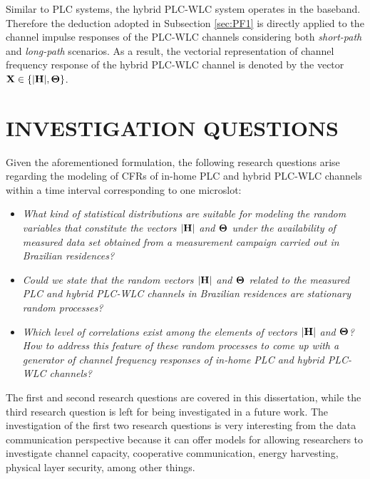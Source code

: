 Similar to \ac{PLC} systems, the hybrid \ac{PLC}-\ac{WLC} system operates in the baseband. Therefore the deduction adopted in Subsection \ref{sec:PF1} is directly applied to the channel impulse responses of the \ac{PLC}-\ac{WLC} channels considering both \textit{short-path} and \textit{long-path} scenarios. As a result, the vectorial representation of channel frequency response of the hybrid \ac{PLC}-\ac{WLC} channel is denoted by the vector ${\bf X} \in \{ |{\bf H}|, {\bf \Theta} \}$. 

\section{INVESTIGATION QUESTIONS} \label{sec:PF3}

Given the aforementioned formulation, the following research questions arise regarding the modeling of \acp{CFR} of in-home \ac{PLC} and hybrid \ac{PLC}-\ac{WLC} channels within a time interval corresponding to one microslot: 

\begin{itemize}
	\item \textit{What kind of statistical distributions are suitable for modeling the random variables that constitute the vectors $|{\bf H}|$ and ${\bf \Theta}$ under the availability of measured data set obtained from a measurement campaign carried out in Brazilian residences?}
	\item \textit{Could we state that the random vectors $|{\bf H}|$ and ${\bf \Theta}$ related to the measured \ac{PLC} and hybrid \ac{PLC}-\ac{WLC} channels in Brazilian residences are stationary random processes?}
    \item \textit{Which level of correlations exist among the elements of vectors $|{\bf H}|$ and ${\bf \Theta}$? How to address this feature of  these random processes to come up with a generator of channel frequency responses of in-home \ac{PLC} and hybrid \ac{PLC}-\ac{WLC} channels?}  
\end{itemize}

The first and second research questions are covered in this dissertation, while the third research question is left for being investigated in a future work. The investigation of the first two research questions is very interesting from the data communication perspective because it can offer models for allowing researchers to investigate channel capacity, cooperative communication, energy harvesting, physical layer security, among other things.

